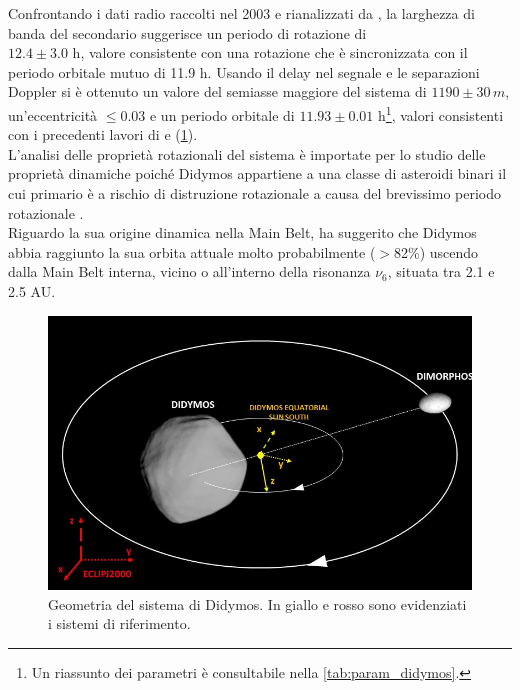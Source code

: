Confrontando i dati radio raccolti nel 2003 e rianalizzati da \citet{naidu_radar_2020}, la larghezza di banda del secondario suggerisce un periodo di rotazione di\\$12.4\pm 3.0$ h, valore consistente con una rotazione che è sincronizzata con il periodo orbitale mutuo di 11.9 h. Usando il delay nel segnale e le separazioni Doppler si è ottenuto un valore del semiasse maggiore del sistema di $1190\pm 30\, m$, un'eccentricità $\leq 0.03$ e un periodo orbitale di $11.93\pm 0.01$ h\footnote{Un riassunto dei parametri è consultabile nella \cref{tab:param_didymos}.}, valori consistenti con i precedenti lavori di \citet{scheirich_modeling_2009} e \citet{fang_near-earth_2012} (\cref{fig:system_orbit}).\\
L'analisi delle proprietà rotazionali del sistema è importate per lo studio delle proprietà dinamiche poiché Didymos appartiene a una classe di asteroidi binari il cui primario è a rischio di distruzione rotazionale a causa del brevissimo periodo rotazionale \citep{walsh_rotational_2008}.\\
Riguardo la sua origine dinamica nella Main Belt, \citet{richardson_dynamical_2016} ha suggerito che Didymos abbia raggiunto la sua orbita attuale molto probabilmente ($>$82\%) uscendo dalla Main Belt interna, vicino o all'interno della risonanza $\nu_6$, situata tra 2.1 e 2.5 AU.

\begin{figure}[!h]
    \centering
    \includegraphics[scale=0.78]{figure/system_orbit.jpg}
    \caption[Geometria del sistema di Didymos.]{Geometria del sistema di Didymos. In giallo e rosso sono evidenziati i sistemi di riferimento. \citep{bottiglieri_applied_2022}}
    \label{fig:system_orbit}
\end{figure}

